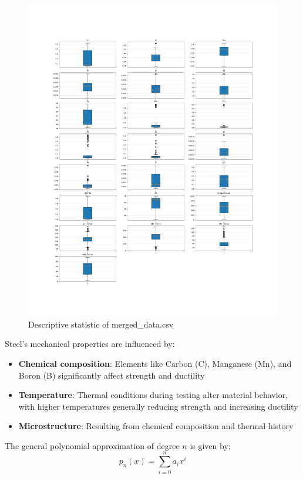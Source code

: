 \documentclass[10pt]{article}
\begin{document}
\begin{figure}
    \centering
    \includegraphics[width=\linewidth]{figures/03_leastsq/statdesc.png}
    \caption{Descriptive statistic of merged\_data.csv}
    \label{fig:enter-label}
\end{figure}

Steel's mechanical properties are influenced by:
\begin{itemize}
    \item \textbf{Chemical composition}: Elements like Carbon (C), Manganese (Mn), and Boron (B) significantly affect strength and ductility
    \item \textbf{Temperature}: Thermal conditions during testing alter material behavior, with higher temperatures generally reducing strength and increasing ductility
    \item \textbf{Microstructure}: Resulting from chemical composition and thermal history
\end{itemize}

The general polynomial approximation of degree $n$ is given by:
\begin{equation}
p_n(x) = \sum_{i=0}^{n} a_i x^i
\end{equation}
\end{document}
